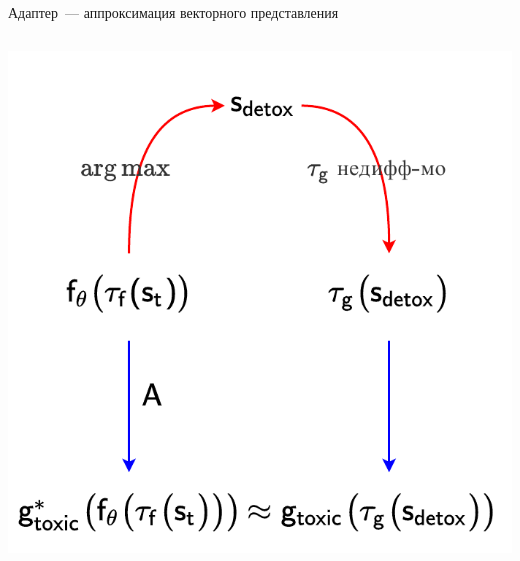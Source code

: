 \documentclass[12pt, fleqn, xcolor=x11names, xcolor=table, aspectratio=169]{beamer}
\begin{document}
\begin{frame}{Адаптер~--- аппроксимация векторного представления}
\begin{columns}[c]
\includegraphics[width=1.2\textwidth, left]{images/pres_non_diff_loss.pdf}
\end{columns} 
\end{frame}

\end{document}
